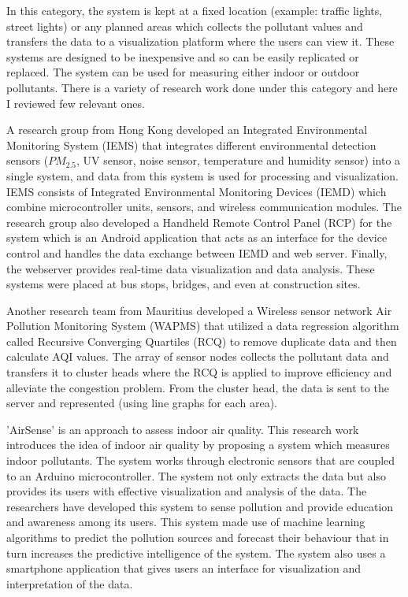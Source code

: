  In this category, the system is kept at a fixed location (example: traffic lights, street lights) or any planned areas \cite{Pavani2017} which collects the pollutant values and transfers the data to a visualization platform where the users can view it. These systems are designed to be  inexpensive and so can be easily replicated or replaced. The system can be used for measuring either indoor or outdoor pollutants. There is a variety of research work done under this category and here I reviewed few relevant ones.
 \par
  A research group from Hong Kong developed an Integrated Environmental Monitoring System (IEMS)\cite{Wong2014} that integrates different environmental detection sensors ($PM_{2.5}$, UV sensor, noise sensor, temperature and humidity sensor) into a single system, and data from this system is used for processing and visualization. IEMS consists of Integrated Environmental Monitoring Devices (IEMD) which combine microcontroller units, sensors, and wireless communication modules. The research group also developed a Handheld Remote Control Panel (RCP) for the system which is an Android application that acts as an interface for the device control and handles the data exchange between IEMD and web server. Finally, the webserver provides real-time data visualization and data analysis. These systems were placed at bus stops, bridges, and even at construction sites. 
  
  Another research team from Mauritius developed a Wireless sensor network Air Pollution Monitoring System (WAPMS) \cite{K.Khedo2010} that utilized a data regression algorithm called Recursive Converging Quartiles (RCQ) to remove duplicate data and then calculate AQI values. The array of sensor nodes collects the pollutant data and transfers it to cluster heads where the RCQ is applied to improve efficiency and alleviate the congestion problem. From the cluster head, the data is sent to the server and represented (using line graphs for each area).

'AirSense'\cite{Fang2016} is an approach to assess indoor air quality. This research work introduces the idea of indoor air quality by proposing a system which measures indoor pollutants. The system works through electronic sensors that are coupled to an Arduino microcontroller. The system not only extracts the data but also provides its users with effective visualization and analysis of the data. The researchers have developed this system to sense pollution and provide education and awareness among its users. This system made use of machine learning algorithms to predict the pollution sources and forecast their behaviour that in turn increases the predictive intelligence of the system. The system also uses a smartphone application that gives users an interface for visualization and interpretation of the data. 


